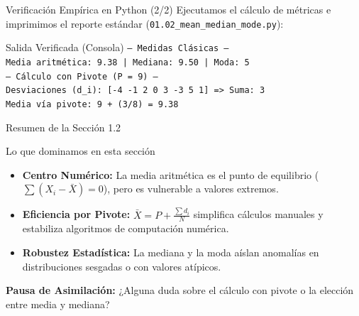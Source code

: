 \documentclass[10pt,aspectratio=169]{beamer}
\begin{document}
\begin{frame}[fragile]{Verificación Empírica en Python (2/2)}
  \footnotesize
  Ejecutamos el cálculo de métricas e imprimimos el reporte estándar (\texttt{01.02\_mean\_median\_mode.py}):

  \vspace{0.2em}
  {\lstset{basicstyle=\ttfamily\tiny, aboveskip=0.2em, belowskip=0.2em}
  
  }

  \vspace{0.2em}
  \begin{block}{\footnotesize Salida Verificada (Consola)}
    {\fontsize{6.5pt}{7.5pt}\selectfont
    \texttt{--- Medidas Clásicas ---} \\
    \texttt{Media aritmética: 9.38 | Mediana: 9.50 | Moda: 5} \\
    \texttt{--- Cálculo con Pivote (P = 9) ---} \\
    \texttt{Desviaciones (d\_i): [-4 -1  2  0  3 -3  5  1] => Suma: 3} \\
    \texttt{Media vía pivote:   9 + (3/8) = 9.38}
    }
  \end{block}
\end{frame}

\begin{frame}{Resumen de la Sección 1.2}
  \begin{block}{Lo que dominamos en esta sección}
    \begin{itemize}
      \item \textbf{Centro Numérico:} La media aritmética es el punto de equilibrio ($\sum(X_i - \bar{X}) = 0$), pero es vulnerable a valores extremos. \pause
      \item \textbf{Eficiencia por Pivote:} $\bar{X} = P + \frac{\sum d_i}{N}$ simplifica cálculos manuales y estabiliza algoritmos de computación numérica. \pause
      \item \textbf{Robustez Estadística:} La mediana y la moda aíslan anomalías en distribuciones sesgadas o con valores atípicos.
    \end{itemize}
  \end{block}
  \pause
  \vspace{0.8em}
  \begin{center}
    \color{TecAzulOscuro}\textbf{Pausa de Asimilación:} ¿Alguna duda sobre el cálculo con pivote o la elección entre media y mediana?
    \color{black}
  \end{center}
\end{frame}
\end{document}
